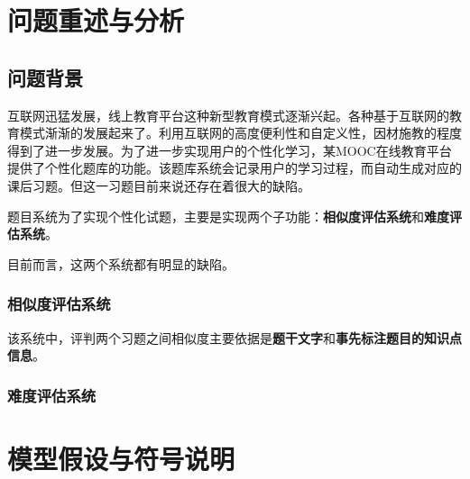 \setcounter{page}{1}    %

%
%

\section{问题重述与分析}

\subsection{问题背景}

互联网迅猛发展，线上教育平台这种新型教育模式逐渐兴起。各种基于互联网的教育模式渐渐的发展起来了。利用互联网的高度便利性和自定义性，因材施教的程度得到了进一步发展。为了进一步实现用户的个性化学习，某\linebreak MOOC在线教育平台提供了个性化题库的功能。该题库系统会记录用户的学习过程，而自动生成对应的课后习题。但这一习题目前来说还存在着很大的缺陷。

题目系统为了实现个性化试题，主要是实现两个子功能：\textbf{相似度评估系统}和\textbf{难度评估系统}。

目前而言，这两个系统都有明显的缺陷。

\subsubsection{相似度评估系统}

该系统中，评判两个习题之间相似度主要依据是\textbf{题干文字}和\textbf{事先标注题目的知识点信息}。

\subsubsection{难度评估系统}



%
%

\section{模型假设与符号说明}